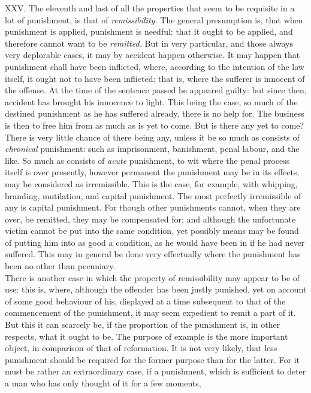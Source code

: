 \documentclass[12pt]{report}
\begin{document}
XXV. The eleventh and last of all the properties that seem to be
requisite in a lot of punishment, is that of \emph{remissibility.} The
general presumption is, that when punishment is applied, punishment is
needful: that it ought to be applied, and therefore cannot want to be
\emph{remitted.} But in very particular, and those always very
deplorable cases, it may by accident happen otherwise. It may happen
that punishment shall have been inflicted, where, according to the
intention of the law itself, it ought not to have been inflicted: that
is, where the sufferer is innocent of the offense. At the time of the
sentence passed he appeared guilty: but since then, accident has brought
his innocence to light. This being the case, so much of the destined
punishment as he has suffered already, there is no help for. The
business is then to free him from as much as is yet to come. But is
there any yet to come? There is very little chance of there being any,
unless it be so much as consists of \emph{chronical} punishment: such as
imprisonment, banishment, penal labour, and the like. So much as
consists of \emph{acute} punishment, to wit where the penal process
itself is over presently, however permanent the punishment may be in its
effects, may be considered as irremissible. This is the case, for
example, with whipping, branding, mutilation, and capital punishment.
The most perfectly irremissible of any is capital punishment. For though
other punishments cannot, when they are over, be remitted, they may be
compensated for; and although the unfortunate victim cannot be put into
the same condition, yet possibly means may be found of putting him into
as good a condition, as he would have been in if he had never suffered.
This may in general be done very effectually where the punishment has
been no other than pecuniary.\\
There is another case in which the property of remissibility may appear
to be of use: this is, where, although the offender has been justly
punished, yet on account of some good behaviour of his, displayed at a
time subsequent to that of the commencement of the punishment, it may
seem expedient to remit a part of it. But this it can scarcely be, if
the proportion of the punishment is, in other respects, what it ought to
be. The purpose of example is the more important object, in comparison
of that of reformation. It is not very likely, that less punishment
should be required for the former purpose than for the latter. For it
must be rather an extraordinary case, if a punishment, which is
sufficient to deter a man who has only thought of it for a few moments,
\end{document}
